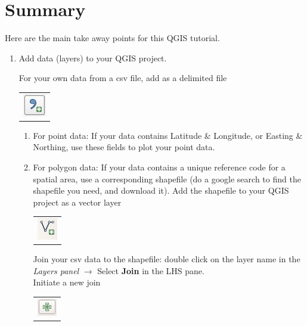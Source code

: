 \chapter{Summary}

\pagestyle{fancy}
\fancyhf{}
\fancyhead[OC]{\leftmark}
\fancyhead[EC]{\rightmark}
\cfoot{\thepage}

Here are the main take away points for this QGIS tutorial.\\

\begin{enumerate}
	\item 
	
Add data (layers) to your QGIS project.

For your own data from a csv file, add as a delimited file 
\begin{tabular}{@{}c@{}}\includegraphics[width=4ex]{images/add_delimited_text_layer_icon.png}\end{tabular}

\begin{enumerate}
	\item 
For point data:
If your data contains Latitude \& Longitude, or Easting \& Northing, use these fields to plot your point data.

	\item 

For polygon data:
If your data contains a unique reference code for a spatial area, use a corresponding shapefile (do a google search to find the shapefile you need, and download it). Add the shapefile to your QGIS project as a vector layer \begin{tabular}{@{}c@{}}\includegraphics[width=4ex]{images/add_vector_layer_icon.png}\end{tabular}

Join your csv data to the shapefile: double click on the layer name in the \textit{Layers panel} $\rightarrow$ Select \textbf{Join} in the LHS pane.\\
Initiate a new join \begin{tabular}{@{}c@{}}\includegraphics[width=4ex]{images/green_button_icon.png}\end{tabular}


\end{enumerate}
\end{enumerate}
